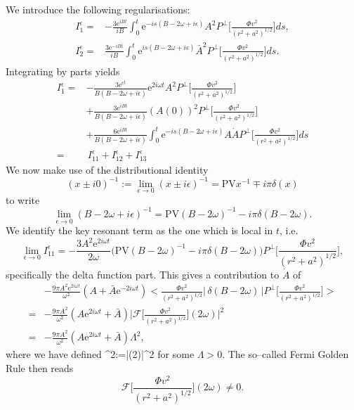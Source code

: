 We introduce the following regularisations:
\begin{align*}
I_1^\epsilon =& -\frac{3\mathrm{e}^{iBt}}{iB}\int_0^t \mathrm{e}^{-is(B-2\omega+ i\epsilon)}A^2P^\perp\bigg[\frac{\Phi v^2}{(r^2+a^2)^{1/2}}\bigg]ds, \\[2pt]
 I_2^\epsilon =&  \frac{3\mathrm{e}^{-iBt}}{iB}\int_0^t \mathrm{e}^{is(B-2\omega + i\epsilon)}\bar{A}^2P^\perp\bigg[\frac{\Phi v^2}{(r^2+a^2)^{1/2}}\bigg]ds.
\end{align*}
Integrating by parts yields
\begin{align*}
I_1^\epsilon =& - \frac{3\mathrm{e}^{ \epsilon t}}{B(B-2\omega+i\epsilon)}\mathrm{e}^{2i\omega t}A^2P^\perp\bigg[\frac{\Phi v^2}{(r^2+a^2)^{1/2}}\bigg] \\
&+ \frac{3\mathrm{e}^{iBt}}{B(B-2\omega+i\epsilon)}(A(0))^2P^\perp\bigg[\frac{\Phi v^2}{(r^2+a^2)^{1/2}}\bigg] \\
&+ \frac{6\mathrm{e}^{iBt}}{B(B-2\omega+i\epsilon)} \int_0^t \mathrm{e}^{-is(B-2\omega+ i\epsilon)}A\dot{A}P^\perp\bigg[\frac{\Phi v^2}{(r^2+a^2)^{1/2}}\bigg]ds \\[2pt]
=& \, I_{11}^\epsilon + I_{12}^\epsilon + I_{13}^\epsilon
\end{align*}
We now make use of the distributional identity
\[
(x\pm i0)^{-1} := \lim_{\epsilon \rightarrow 0}(x\pm i\epsilon)^{-1} = \mathrm{PV}x^{-1}\mp i\pi\delta(x)
\]
to write
\[
\lim_{\epsilon \rightarrow 0}(B-2\omega + i \epsilon)^{-1} = \mathrm{PV}(B-2\omega)^{-1} - i\pi\delta(B-2\omega).
\]
We identify the key resonant term as the one which is local in $t$, i.e.
\[
\lim_{\epsilon \rightarrow 0}I_{11}^\epsilon = - \frac{3A^2\mathrm{e}^{2i\omega t}}{2\omega}\big(\mathrm{PV}(B-2\omega)^{-1}- i \pi\delta(B-2\omega)\big)P^\perp\bigg[\frac{\Phi v^2}{(r^2+a^2)^{1/2}}\bigg],
\]
specifically the delta function part. This gives a contribution to $\dot{A}$ of
\begin{align*}
& -\frac{9\pi A^2\mathrm{e}^{2i\omega t}}{\omega^2}(A + \bar{A}\mathrm{e}^{-2i\omega t})\bigg<\frac{\Phi v^2}{(r^2+a^2)^{1/2}} \bigg|\,\delta(B-2\omega)\,\bigg|P^\perp\bigg[\frac{\Phi v^2}{(r^2+a^2)^{1/2}}\bigg]\bigg> \\
=& -\frac{9\pi A^2}{\omega^2}(A\mathrm{e}^{2i\omega t} + \bar{A})\Bigg|\mathcal{F}\bigg[\frac{\Phi v^2}{(r^2+a^2)^{1/2}}\bigg](2\omega)\Bigg|^2 \\
=& -\frac{9\pi A^2}{\omega^2}(A\mathrm{e}^{2i\omega t} + \bar{A})\Lambda^2,
\end{align*}
where we have defined
\be
\label{eq:Lambda}
\Lambda^2:=\Bigg|(2\omega)\Bigg|^2
\ee
for some $\Lambda>0$. The so--called Fermi Golden Rule then reads
\[
\mathcal{F}\bigg[\frac{\Phi v^2}{(r^2+a^2)^{1/2}}\bigg](2\omega) \neq 0.
\]

